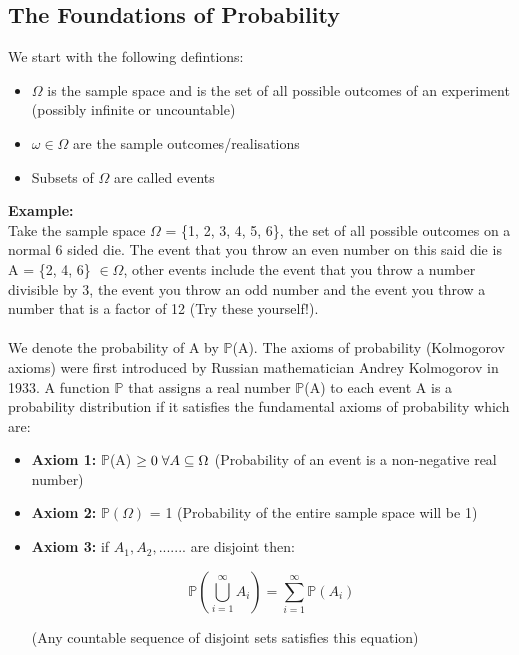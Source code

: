 \documentclass[,oneside]{article}
\begin{document}
\subsection{The Foundations of Probability}
We start with the following defintions:
\begin{itemize}
\item $\Omega$ is the sample space and is the set of all possible outcomes of an experiment (possibly infinite or uncountable)
\item $\omega \in \Omega$ are the sample outcomes/realisations
\item Subsets of $\Omega$ are called events 
\end{itemize}
\textbf{Example:}\\
Take the sample space $\Omega$ = \{1, 2, 3, 4, 5, 6\}, the set of all possible outcomes on a normal 6 sided die. The event that you throw an even number on this said die is A = \{2, 4, 6\} $\in \Omega$, other events include the event that you throw a number divisible by 3, the event you throw an odd number and the event you throw a number that is a factor of 12 (Try these yourself!). \\
\\
We denote the probability of A by $\mathbb{P}$(A). The axioms of probability (Kolmogorov axioms) were first introduced by Russian mathematician Andrey Kolmogorov in 1933. A function $\mathbb{P}$ that assigns a real number $\mathbb{P}$(A) to each event A is a probability distribution if it satisfies the fundamental axioms of probability which are:
\begin{itemize}
\item \textbf{Axiom 1:} $\mathbb{P}$(A) $\geq 0 \hspace{0.1cm}\forall A \subseteq \Omega$ (Probability of an event is a non-negative real number)
\item \textbf{Axiom 2:} $\mathbb{P}(\Omega)$ = 1 (Probability of the entire sample space will be 1)
\item \textbf{Axiom 3:} if $A_1, A_2,.......$ are disjoint then:
\begin{center}
 \[ \mathbb{P}\left(\bigcup_{i=1}^{\infty} A_i\right) = \sum_{i=1}^{\infty} \mathbb{P}\left(A_i  \right)\]
\end{center}
(Any countable sequence of disjoint sets satisfies this equation)\\ \\
\end{itemize}
\end{document}
